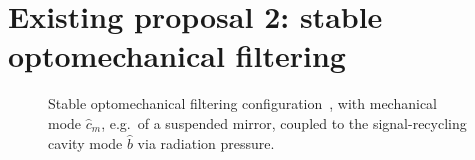 \section{Existing proposal 2: stable optomechanical filtering}

\begin{figure}
	\centering
	\caption{Stable optomechanical filtering configuration~\cite{Li2021}, with mechanical mode $\hat{c}_m$, e.g.\ of a suspended mirror, coupled to the signal-recycling cavity mode $\hat b$ via radiation pressure.}
	\label{fig:sWLC_config}
\end{figure}



